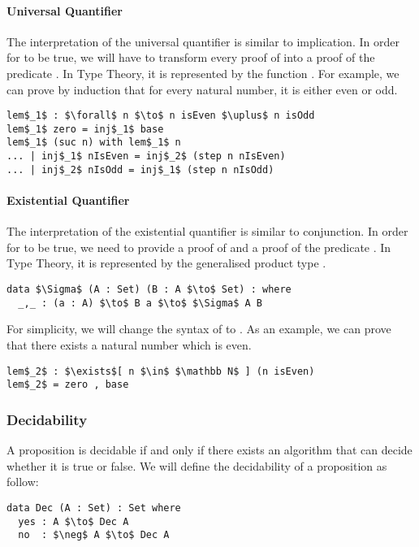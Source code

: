 \paragraph{Universal Quantifier} The interpretation of the universal quantifier is similar to
implication. In order for  to be true, we will have
to transform every proof  of  into a proof of the predicate
. In Type Theory, it is represented by the function . For example, we can prove by induction that for every natural
number, it is either even or odd.
\begin{lstlisting}[mathescape=true,xleftmargin=.3\textwidth]
lem$_1$ : $\forall$ n $\to$ n isEven $\uplus$ n isOdd
lem$_1$ zero = inj$_1$ base
lem$_1$ (suc n) with lem$_1$ n
... | inj$_1$ nIsEven = inj$_2$ (step n nIsEven)
... | inj$_2$ nIsOdd = inj$_1$ (step n nIsOdd)
\end{lstlisting} 

\paragraph{Existential Quantifier} The interpretation of the
existential quantifier is similar to conjunction. In order for
 to be true, we need to provide a proof
 of  and a proof  of the predicate
. In Type Theory, it is represented by the generalised
product type \mb{\Sigma}. 
\begin{lstlisting}[mathescape=true,xleftmargin=.3\textwidth]
data $\Sigma$ (A : Set) (B : A $\to$ Set) : where
  _,_ : (a : A) $\to$ B a $\to$ $\Sigma$ A B
\end{lstlisting}
\par For simplicity, we will change the syntax of \mb{\Sigma} to
. As an example, we can prove that
there exists a natural number which is even. 
\begin{lstlisting}[mathescape=true,xleftmargin=.3\textwidth]
lem$_2$ : $\exists$[ n $\in$ $\mathbb N$ ] (n isEven)
lem$_2$ = zero , base
\end{lstlisting}


\subsubsection{Decidability} 
\par A proposition  is decidable if and only if there
exists an algorithm that can decide whether it is true or false. We
will define the decidability of a proposition as follow:
\begin{lstlisting}[mathescape=true,xleftmargin=.3\textwidth]
data Dec (A : Set) : Set where
  yes : A $\to$ Dec A
  no  : $\neg$ A $\to$ Dec A
\end{lstlisting}



